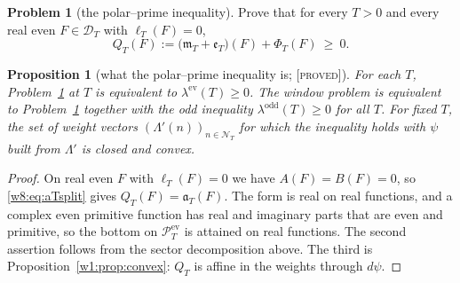 \documentclass[11pt]{amsart}
\newtheorem{proposition}[theorem]{Proposition}
\theoremstyle{definition}
\newtheorem{problem}[theorem]{Problem}
\theoremstyle{remark}
\numberwithin{equation}{section}
\newcommand{\PT}{\mathcal{P}_T}                        %
\newcommand{\DT}{\mathcal{D}_T}                        %
\newcommand{\NT}{\mathcal{N}_T}                        %
\newcommand{\mT}{\mathfrak{m}_T}                       %
\newcommand{\aT}{\mathfrak{a}_T}                       %
\newcommand{\stag}[1]{\textsc{[#1]}}
\newcommand{\PROVED}{\stag{proved}}
\begin{document}
\begin{problem}[the polar--prime inequality]\label{w8:prob:polarprime}
Prove that for every $T>0$ and every real even $F\in\DT$ with $\ell_T(F)=0$,
\[
Q_T(F):=\bigl(\mT+\mathfrak e_T\bigr)(F)+\Phi_T(F)\ \ge\ 0 .
\]
\end{problem}

\begin{proposition}[what the polar--prime inequality is; \PROVED]\label{w8:prop:polarprime}
For each $T$, Problem~\ref{w8:prob:polarprime} at $T$ is equivalent to $\lambda^{\mathrm{ev}}(T)\ge0$. The window
problem is equivalent to Problem~\ref{w8:prob:polarprime} together with the odd inequality $\lambda^{\mathrm{odd}}(T)\ge0$
for all $T$. For fixed $T$, the set of weight vectors $(\Lambda'(n))_{n\in\NT}$ for which the inequality holds with
$\psi$ built from $\Lambda'$ is closed and convex.
\end{proposition}

\begin{proof}
On real even $F$ with $\ell_T(F)=0$ we have $A(F)=B(F)=0$, so \eqref{w8:eq:aTsplit} gives $Q_T(F)=\aT(F)$. The form
is real on real functions, and a complex even primitive function has real and imaginary parts that are even and
primitive, so the bottom on $\PT^{\mathrm{ev}}$ is attained on real functions. The second assertion follows from the
sector decomposition above. The third is Proposition~\ref{w1:prop:convex}: $Q_T$ is affine in the weights through
$d\psi$.
\end{proof}
\end{document}
